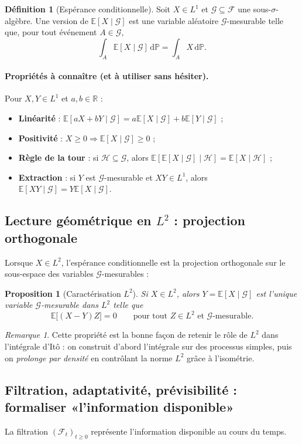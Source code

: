 \documentclass[11pt,a4paper]{report}
\theoremstyle{definition}
\newtheorem{definition}{Définition}[chapter]
\theoremstyle{plain}
\newtheorem{proposition}{Proposition}[chapter]
\theoremstyle{remark}
\newtheorem{remark}{Remarque}[chapter]
\newcommand{\dd}{\mathrm{d}}
\newcommand{\E}{\mathbb{E}}
\newcommand{\1}{\mathbf{1}}
\newcommand{\Pmeas}{\mathbb{P}}
\newcommand{\R}{\mathbb{R}}
\newcommand{\F}{\mathcal{F}}
\newcommand{\G}{\mathcal{G}}
\begin{document}
\begin{definition}[Espérance conditionnelle]
Soit $X\in L^1$ et $\G\subseteq\F$ une sous-$\sigma$-algèbre.
Une version de $\E[X\mid \G]$ est une variable aléatoire $\G$-mesurable telle que, pour tout événement $A\in\G$,
\[
\int_A \E[X\mid \G]\,\dd\Pmeas=\int_A X\,\dd\Pmeas.
\]
\end{definition}

\paragraph{Propriétés à connaître (et à utiliser sans hésiter).}
Pour $X,Y\in L^1$ et $a,b\in\R$ :
\begin{itemize}[leftmargin=*]
\item \textbf{Linéarité} : $\E[aX+bY\mid \G]=a\E[X\mid \G]+b\E[Y\mid \G]$ ;
\item \textbf{Positivité} : $X\ge 0\Rightarrow \E[X\mid \G]\ge 0$ ;
\item \textbf{Règle de la tour} : si $\mathcal{H}\subseteq\G$, alors $\E[\E[X\mid \G]\mid \mathcal{H}]=\E[X\mid \mathcal{H}]$ ;
\item \textbf{Extraction} : si $Y$ est $\G$-mesurable et $XY\in L^1$, alors $\E[XY\mid \G]=Y\E[X\mid \G]$.
\end{itemize}

\subsection*{Lecture géométrique en $L^2$ : projection orthogonale}
Lorsque $X\in L^2$, l'espérance conditionnelle est la projection orthogonale sur le sous-espace des variables $\G$-mesurables :

\begin{proposition}[Caractérisation $L^2$]
Si $X\in L^2$, alors $Y=\E[X\mid \G]$ est l'unique variable $\G$-mesurable dans $L^2$ telle que
\[
\E\big[(X-Y)Z\big]=0\qquad \text{pour tout } Z\in L^2 \text{ et } \G\text{-mesurable}.
\]
\end{proposition}

\begin{remark}
Cette propriété est la bonne façon de retenir le rôle de $L^2$ dans l'intégrale d'Itô : on construit d'abord l'intégrale sur des processus simples, puis on \emph{prolonge par densité} en contrôlant la norme $L^2$ grâce à l'isométrie.
\end{remark}

\subsection*{Filtration, adaptativité, prévisibilité : formaliser «l'information disponible»}
La filtration $(\F_t)_{t\ge 0}$ représente l'information disponible au cours du temps.
\end{document}
